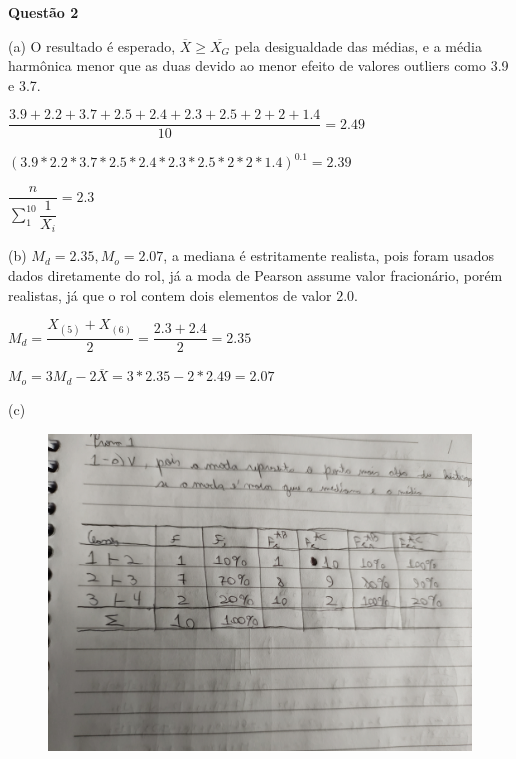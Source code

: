 \documentclass[12pt]{article}   %
\begin{document}
\vspace{+12pt}
\par \textbf{Questão 2}
\vspace{+12pt}
\par (a) O resultado é esperado, $\overline{X} \geq \overline{X_G}$ pela desigualdade das médias, e a média harmônica menor que as duas devido ao menor efeito de valores outliers como 3.9 e 3.7.
\vspace{+6pt}
\par $\dfrac{3.9+2.2+3.7+2.5+2.4+2.3+2.5+2+2+1.4}{10} = 2.49$
\vspace{+6pt}
\par $(3.9*2.2*3.7*2.5*2.4*2.3*2.5*2*2*1.4)^{0.1} = 2.39$
\vspace{+6pt}
\par $\dfrac{n}{\sum_{1}^{10} \dfrac{1}{X_i}} = 2.3$
\vspace{+6pt}
\par (b) $M_d = 2.35, M_o = 2.07$, a mediana é estritamente realista, pois foram usados dados diretamente do rol, já a moda de Pearson assume valor fracionário, porém realistas, já que o rol contem dois elementos de valor $2.0$.
\vspace{+6pt}
\par $M_d = \dfrac{X_{(5)} + X_{(6)}}{2} = \dfrac{2.3 + 2.4}{2} = 2.35$
\vspace{+6pt}
\par $M_o = 3M_d - 2\overline{X} = 3*2.35 - 2*2.49 = 2.07$
\vspace{+6pt}
\par (c)
	\begin{figure}[h!]
		\includegraphics[scale=0.05]{q2c}
	\end{figure}
\end{document}
